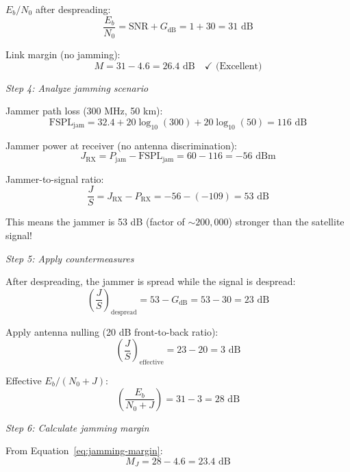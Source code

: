 $E_b/N_0$ after despreading:
\begin{equation}
\frac{E_b}{N_0} = \text{SNR} + G_{\text{dB}} = 1 + 30 = 31 \text{ dB}
\end{equation}

Link margin (no jamming):
\begin{equation}
M = 31 - 4.6 = 26.4 \text{ dB} \quad \checkmark \text{ (Excellent)}
\end{equation}

\textit{Step 4: Analyze jamming scenario}

Jammer path loss (300 MHz, 50 km):
\begin{equation}
\text{FSPL}_{\text{jam}} = 32.4 + 20\log_{10}(300) + 20\log_{10}(50) = 116 \text{ dB}
\end{equation}

Jammer power at receiver (no antenna discrimination):
\begin{equation}
J_{\text{RX}} = P_{\text{jam}} - \text{FSPL}_{\text{jam}} = 60 - 116 = -56 \text{ dBm}
\end{equation}

Jammer-to-signal ratio:
\begin{equation}
\frac{J}{S} = J_{\text{RX}} - P_{\text{RX}} = -56 - (-109) = 53 \text{ dB}
\end{equation}

This means the jammer is 53 dB (factor of $\sim 200{,}000$) stronger than the satellite signal!

\textit{Step 5: Apply countermeasures}

After despreading, the jammer is spread while the signal is despread:
\begin{equation}
\left(\frac{J}{S}\right)_{\text{despread}} = 53 - G_{\text{dB}} = 53 - 30 = 23 \text{ dB}
\end{equation}

Apply antenna nulling (20 dB front-to-back ratio):
\begin{equation}
\left(\frac{J}{S}\right)_{\text{effective}} = 23 - 20 = 3 \text{ dB}
\end{equation}

Effective $E_b/(N_0 + J)$:
\begin{equation}
\left(\frac{E_b}{N_0 + J}\right) = 31 - 3 = 28 \text{ dB}
\end{equation}

\textit{Step 6: Calculate jamming margin}

From Equation~\ref{eq:jamming-margin}:
\begin{equation}
M_J = 28 - 4.6 = 23.4 \text{ dB}
\end{equation}

